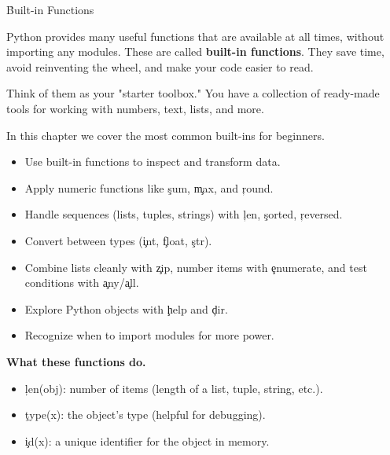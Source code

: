 
\h{Built-in Functions}

Python provides many useful functions that are available at all times, without importing
any modules. These are called \textbf{built-in functions}. They save time, avoid 
reinventing the wheel, and make your code easier to read.

Think of them as your "starter toolbox." You have a collection of ready-made tools for 
working with numbers, text, lists, and more.

In this chapter we cover the most common built-ins for beginners.

\begin{tcolorbox}[title=Focus of this chapter:,colframe=orange,colback=white,arc=2mm]
\begin{itemize}
    \item Use built-in functions to inspect and transform data.
    \item Apply numeric functions like \c{sum}, \c{max}, and \c{round}.
    \item Handle sequences (lists, tuples, strings) with \c{len}, \c{sorted}, \c{reversed}.
    \item Convert between types (\c{int}, \c{float}, \c{str}).
    \item Combine lists cleanly with \c{zip}, number items with \c{enumerate}, 
          and test conditions with \c{any}/\c{all}.
    \item Explore Python objects with \c{help} and \c{dir}.
    \item Recognize when to import modules for more power.
\end{itemize}
\end{tcolorbox}




\noindent
\textbf{What these functions do.}
\begin{itemize}
  \item \c{len(obj)}: number of items (length of a list, tuple, string, etc.).
  \item \c{type(x)}: the object's type (helpful for debugging).
  \item \c{id(x)}: a unique identifier for the object in memory.
\end{itemize}

